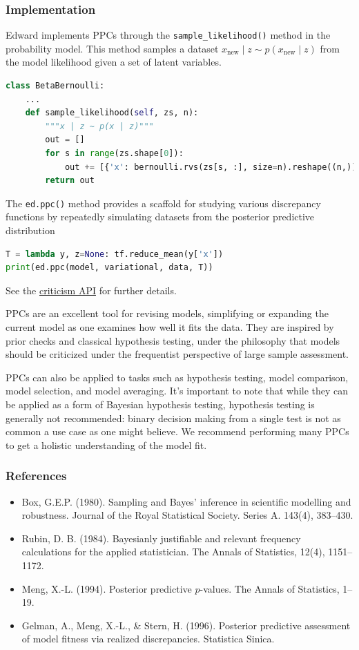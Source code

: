 \subsubsection{Implementation}

Edward implements PPCs through the \texttt{sample_likelihood()}
method in the probability model. This method samples a dataset
$x_{\text{new}}\mid z\sim p(x_{\text{new}}\mid z)$ from the
model likelihood given a set of latent variables.
\begin{lstlisting}[language=Python]
class BetaBernoulli:
    ...
    def sample_likelihood(self, zs, n):
        """x | z ~ p(x | z)"""
        out = []
        for s in range(zs.shape[0]):
            out += [{'x': bernoulli.rvs(zs[s, :], size=n).reshape((n,))}]
        return out
\end{lstlisting}

The \texttt{ed.ppc()} method provides a scaffold for studying
various discrepancy functions by repeatedly simulating datasets from the
posterior predictive distribution
\begin{lstlisting}[language=Python]
T = lambda y, z=None: tf.reduce_mean(y['x'])
print(ed.ppc(model, variational, data, T))
\end{lstlisting}

See the \href{api/criticisms.html}{criticism API} for further details.

PPCs are an excellent tool for revising models, simplifying or
expanding the current model as one examines how well it fits the data.
They are inspired by prior checks and classical hypothesis
testing, under the philosophy that models should be
criticized under the frequentist perspective of large sample
assessment.

PPCs can also be applied to tasks such as hypothesis testing, model
comparison, model selection, and model averaging.  It's important to
note that while they can be applied as a form of Bayesian hypothesis
testing, hypothesis testing is generally not recommended: binary
decision making from a single test is not as common a use case as one
might believe. We recommend performing many PPCs to get a holistic
understanding of the model fit.

\subsubsection{References}\label{references}

\begin{itemize}
\item
  Box, G.E.P. (1980). Sampling and Bayes' inference in scientific modelling and
  robustness. Journal of the Royal Statistical Society. Series A. 143(4), 383–430.
\item
  Rubin, D. B. (1984). Bayesianly justifiable and relevant frequency
  calculations for the applied statistician. The Annals of Statistics,
  12(4), 1151–1172.
\item
  Meng, X.-L. (1994). Posterior predictive $p$-values. The Annals of
  Statistics, 1–19.
\item
  Gelman, A., Meng, X.-L., \& Stern, H. (1996). Posterior predictive assessment
  of model fitness via realized discrepancies. Statistica Sinica.
\end{itemize}
